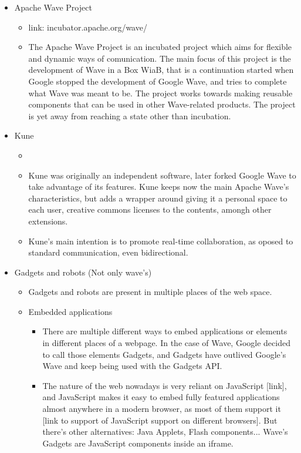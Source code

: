 
\begin{itemize}
  \item Apache Wave Project
  \begin{itemize}
    \item link: incubator.apache.org/wave/
    \item The Apache Wave Project is an incubated project which aims for flexible and dynamic ways of comunication. The main focus of this project is the development of Wave in a Box WiaB, that is a continuation started when Google stopped the development of Google Wave, and tries to complete what Wave was meant to be. The project works towards making reusable components that can be used in other Wave-related products. The project is yet away from reaching a state other than incubation.
  \end{itemize}
  \item Kune
  \begin{itemize}
    \item {}
    \item Kune was originally an independent software, later forked Google Wave to take advantage of its features. Kune keeps now the main Apache Wave's characteristics, but adds a wrapper around giving it a personal space to each user, creative commons licenses to the contents, amongh other extensions.
    \item Kune's main intention is to promote real-time collaboration, as oposed to standard communication, even bidirectional.
  \end{itemize}
  \item Gadgets and robots (Not only wave's)
    \begin{itemize}
      \item Gadgets and robots are present in multiple places of the web space.
      \item Embedded applications
      \begin{itemize}
        \item There are multiple different ways to embed applications or elements in different places of a webpage. In the case of Wave, Google decided to call those elements Gadgets, and Gadgets have outlived Google's Wave and keep being used with the Gadgets API.
        \item The nature of the web nowadays is very reliant on JavaScript [link], and JavaScript makes it easy to embed fully featured applications almost anywhere in a modern browser, as most of them support it [link to support of JavaScript support on different browsers]. But there's other alternatives: Java Applets, Flash components... Wave's Gadgets are JavaScript components inside an iframe.

\end{itemize}
\end{itemize}
\end{itemize}
